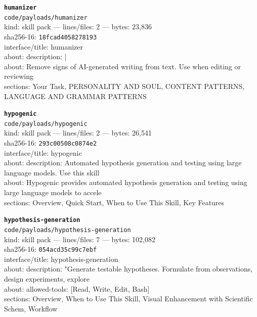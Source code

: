 \noindent\textbf{\texttt{humanizer}}\\
\texttt{code/payloads/humanizer}\\
kind: skill pack --- lines/files: 2 --- bytes: 23,836\\
sha256-16: \texttt{18fcad4058278193}\\
interface/title: humanizer\\
about: description: |\\
about: Remove signs of AI-generated writing from text. Use when editing or reviewing\\
sections: Your Task, PERSONALITY AND SOUL, CONTENT PATTERNS, LANGUAGE AND GRAMMAR PATTERNS\\
\vspace*{6.0pt}

\noindent\textbf{\texttt{hypogenic}}\\
\texttt{code/payloads/hypogenic}\\
kind: skill pack --- lines/files: 2 --- bytes: 26,541\\
sha256-16: \texttt{293c00508c0874e2}\\
interface/title: hypogenic\\
about: description: Automated hypothesis generation and testing using large language models. Use this skill\\
about: Hypogenic provides automated hypothesis generation and testing using large language models to accele\\
sections: Overview, Quick Start, When to Use This Skill, Key Features\\
\vspace*{6.0pt}

\noindent\textbf{\texttt{hypothesis-generation}}\\
\texttt{code/payloads/hypothesis-generation}\\
kind: skill pack --- lines/files: 7 --- bytes: 102,082\\
sha256-16: \texttt{054acd35c99c7ebf}\\
interface/title: hypothesis-generation\\
about: description: "Generate testable hypotheses. Formulate from observations, design experiments, explore\\
about: allowed-tools: [Read, Write, Edit, Bash]\\
sections: Overview, When to Use This Skill, Visual Enhancement with Scientific Schem, Workflow\\
\vspace*{6.0pt}

